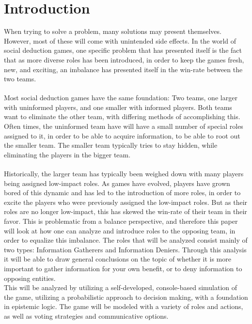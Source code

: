 \section{Introduction}
When trying to solve a problem, many solutions may present themselves. However, 
most of these will come with unintended side effects. In the world of social 
deduction games, one specific problem that has presented itself is the fact 
that as more diverse roles has been introduced, in order to keep the games 
fresh, new, and exciting, an imbalance has presented itself in the win-rate 
between the two teams. \\ \\
Most social deduction games have the same foundation: Two teams, one larger 
with uninformed players, and one smaller with informed players. Both teams want 
to eliminate the other team, with differing methods of accomplishing this. Often 
times, the uninformed team have will have a small number of special roles 
assigned to it, in order to be able to acquire information, to be able to root 
out the smaller team. The smaller team typically tries to stay hidden, while 
eliminating the players in the bigger team.\\ \\
Historically, the larger team has typically been weighed down with many players 
being assigned low-impact roles. 
As games have evolved, players have grown bored of this dynamic and has led to 
the introduction of more roles, in order to excite the players who were 
previously assigned the low-impact roles. But as their roles are no longer 
low-impact, this has skewed the win-rate of their team in their favor. This is 
problematic from a balance perspective, and therefore this paper will look at 
how one can analyze and introduce roles to the opposing team, in order to 
equalize this imbalance. The roles that will be analyzed consist mainly of two 
types: Information Gatherers and Information Deniers. Through this analysis it 
will be able to draw general conclusions on the topic of whether it is more 
important to gather information for your own benefit, or to deny information to 
opposing entities. \\

This will be analyzed by utilizing a self-developed, console-based simulation
of the game, utilizing a probabilistic approach to decision making, with a
foundation in epistemic logic. The game will be modeled with a variety of roles and actions, as well as voting strategies and communicative options. 

